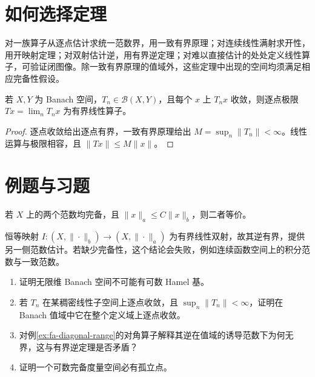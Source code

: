 \section{如何选择定理}
对一族算子从逐点估计求统一范数界，用一致有界原理；对连续线性满射求开性，用开映射定理；对双射估计逆，用有界逆定理；对难以直接估计的处处定义线性算子，可验证闭图像。除一致有界原理的值域外，这些定理中出现的空间均须满足相应完备性假设。

\begin{proposition}
若 $X,Y$ 为 Banach 空间，$T_n\in\mathcal B(X,Y)$，且每个 $x$ 上 $T_nx$ 收敛，则逐点极限 $Tx=\lim_nT_nx$ 为有界线性算子。
\end{proposition}
\begin{proof}
逐点收敛给出逐点有界，一致有界原理给出 $M=\sup_n\|T_n\|<\infty$。线性运算与极限相容，且 $\|Tx\|\leq M\|x\|$。
\end{proof}

\section{例题与习题}
\begin{example}[两个完备范数的等价性]
若 $X$ 上的两个范数均完备，且 $\|x\|_a\leq C\|x\|_b$，则二者等价。
\end{example}
\begin{solve}
恒等映射 $I:(X,\|\cdot\|_b)\to(X,\|\cdot\|_a)$ 为有界线性双射，故其逆有界，提供另一侧范数估计。若缺少完备性，这个结论会失败，例如连续函数空间上的积分范数与一致范数。
\end{solve}
\begin{enumerate}
 \item\label{exer:fa-hamel} 证明无限维 Banach 空间不可能有可数 Hamel 基。
 \item\label{exer:fa-dense-convergence} 若 $T_n$ 在某稠密线性子空间上逐点收敛，且 $\sup_n\|T_n\|<\infty$，证明在 Banach 值域中它在整个定义域上逐点收敛。
 \item 对例\ref{ex:fa-diagonal-range}的对角算子解释其逆在值域的诱导范数下为何无界，这与有界逆定理是否矛盾？
 \item 证明一个可数完备度量空间必有孤立点。
\end{enumerate}

